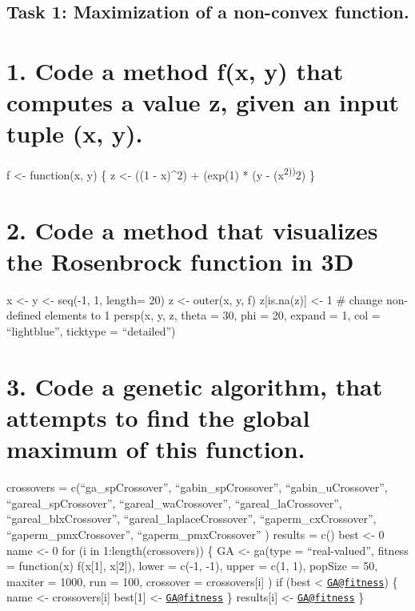 \documentclass[]{article}
\begin{document}
\hypertarget{task-1-maximization-of-a-non-convex-function.}{%
\subsection{Task 1: Maximization of a non-convex
function.}\label{task-1-maximization-of-a-non-convex-function.}}

\hypertarget{code-a-method-fx-y-that-computes-a-value-z-given-an-input-tuple-x-y.}{%
\section{1. Code a method f(x, y) that computes a value z, given an
input tuple (x,
y).}\label{code-a-method-fx-y-that-computes-a-value-z-given-an-input-tuple-x-y.}}

f \textless- function(x, y) \{ z \textless- ((1 - x)\^{}2) + (exp(1) *
(y - (x\textsuperscript{2))}2) \}

\hypertarget{code-a-method-that-visualizes-the-rosenbrock-function-in-3d}{%
\section{2. Code a method that visualizes the Rosenbrock function in
3D}\label{code-a-method-that-visualizes-the-rosenbrock-function-in-3d}}

x \textless- y \textless- seq(-1, 1, length= 20) z \textless- outer(x,
y, f) z{[}is.na(z){]} \textless- 1 \# change non-defined elements to 1
persp(x, y, z, theta = 30, phi = 20, expand = 1, col = ``lightblue'',
ticktype = ``detailed'')

\hypertarget{code-a-genetic-algorithm-that-attempts-to-find-the-global-maximum-of-this-function.}{%
\section{3. Code a genetic algorithm, that attempts to find the global
maximum of this
function.}\label{code-a-genetic-algorithm-that-attempts-to-find-the-global-maximum-of-this-function.}}

crossovers = c(``ga\_spCrossover'', ``gabin\_spCrossover'',
``gabin\_uCrossover'', ``gareal\_spCrossover'', ``gareal\_waCrossover'',
``gareal\_laCrossover'', ``gareal\_blxCrossover'',
``gareal\_laplaceCrossover'', ``gaperm\_cxCrossover'',
``gaperm\_pmxCrossover'', ``gaperm\_pmxCrossover'' ) results = c() best
\textless- 0 name \textless- 0 for (i in 1:length(crossovers)) \{ GA
\textless- ga(type = ``real-valued'', fitness = function(x) f(x{[}1{]},
x{[}2{]}), lower = c(-1, -1), upper = c(1, 1), popSize = 50, maxiter =
1000, run = 100, crossover = crossovers{[}i{]} ) if (best \textless{}
\href{mailto:GA@fitness}{\nolinkurl{GA@fitness}}) \{ name \textless-
crossovers{[}i{]} best{[}1{]} \textless-
\href{mailto:GA@fitness}{\nolinkurl{GA@fitness}} \} results{[}i{]}
\textless- \href{mailto:GA@fitness}{\nolinkurl{GA@fitness}} \}
\end{document}
